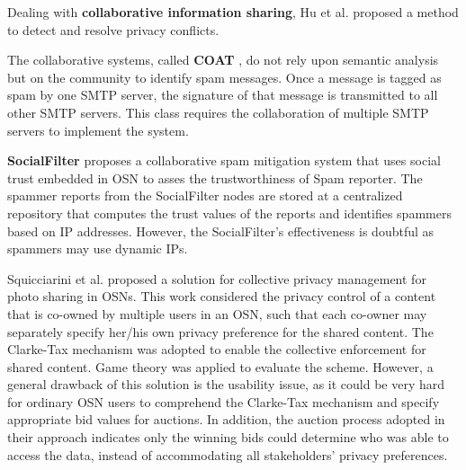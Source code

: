 Dealing with \textbf{collaborative information sharing},
	Hu et al. \cite{biczok_interdependent_2013} proposed a method to detect and resolve privacy conflicts.

The collaborative systems, called \textbf{COAT} \cite{ahmad_coat_2012}, do not rely upon semantic analysis but on the community to identify spam messages.
Once a message is tagged as spam by one SMTP server,
	the signature of that message is transmitted to all other SMTP servers.
This class requires the collaboration of multiple SMTP servers to implement the system.

\textbf{SocialFilter} \cite{yang_socialfilter_2009} proposes a collaborative spam mitigation system that uses social trust embedded in OSN to asses the trustworthiness of Spam reporter.
The spammer reports from the SocialFilter nodes are stored at a centralized repository that computes the trust values of the reports and identifies spammers based on IP addresses.
However,
	the SocialFilter’s effectiveness is doubtful as spammers may use dynamic IPs.

Squicciarini et al. \cite{hu_detecting_2011} proposed a solution for collective privacy management for photo sharing in OSNs.
This work considered the privacy control of a content that is co-owned by multiple users in an OSN,
	such that each co-owner may separately specify her/his own privacy preference for the shared content.
The Clarke-Tax mechanism was adopted to enable the collective enforcement for shared content.
Game theory was applied to evaluate the scheme.
However,
	a general drawback of this solution is the usability issue,
	as it could be very hard for ordinary OSN users to comprehend the Clarke-Tax mechanism and specify appropriate bid values for auctions.
In addition,
	the auction process adopted in their approach indicates only the winning bids could determine who was able to access the data,
	instead of accommodating all stakeholders’ privacy preferences.








